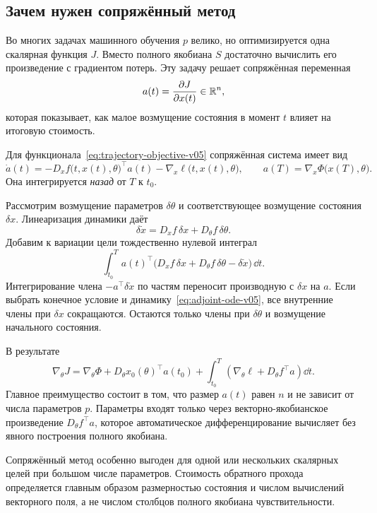 \subsection{Зачем нужен сопряжённый метод}

Во многих задачах машинного обучения $p$ велико, но оптимизируется одна скалярная функция $J$. Вместо полного якобиана $S$ достаточно вычислить его произведение с градиентом потерь. Эту задачу решает сопряжённая переменная
\[
a(t)
=
\frac{\partial J}{\partial x(t)}
\in\mathbb{R}^n,
\]
которая показывает, как малое возмущение состояния в момент $t$ влияет на итоговую стоимость.

Для функционала~\eqref{eq:trajectory-objective-v05} сопряжённая система имеет вид
\begin{equation}
\label{eq:adjoint-ode-v05}
\dot a(t)
=
- D_xf\bigl(t,x(t),\theta\bigr)^\top a(t)
-
\nabla_x\ell\bigl(t,x(t),\theta\bigr),
\qquad
 a(T)=\nabla_x\Phi\bigl(x(T),\theta\bigr).
\end{equation}
Она интегрируется \emph{назад} от $T$ к $t_0$.

\begin{derivation}
Рассмотрим возмущение параметров $\delta\theta$ и соответствующее возмущение состояния $\delta x$. Линеаризация динамики даёт
\[
\delta\dot x
=D_xf\,\delta x+D_\theta f\,\delta\theta.
\]
Добавим к вариации цели тождественно нулевой интеграл
\[
\int_{t_0}^{T}
a(t)^\top
\bigl(D_xf\,\delta x+D_\theta f\,\delta\theta-\delta\dot x\bigr)
\,\dd t.
\]
Интегрирование члена $-a^\top\delta\dot x$ по частям переносит производную с $\delta x$ на $a$. Если выбрать конечное условие и динамику~\eqref{eq:adjoint-ode-v05}, все внутренние члены при $\delta x$ сокращаются. Остаются только члены при $\delta\theta$ и возмущение начального состояния.
\end{derivation}

В результате
\begin{equation}
\label{eq:adjoint-gradient-v05}
\nabla_\theta J
=
\nabla_\theta\Phi
+
D_\theta x_0(\theta)^\top a(t_0)
+
\int_{t_0}^{T}
\left(
\nabla_\theta\ell
+D_\theta f^\top a
\right)\dd t.
\end{equation}
Главное преимущество состоит в том, что размер $a(t)$ равен $n$ и не зависит от числа параметров $p$. Параметры входят только через векторно-якобианское произведение $D_\theta f^\top a$, которое автоматическое дифференцирование вычисляет без явного построения полного якобиана.

\begin{principle}
\label{pr:when-adjoint-v05}
Сопряжённый метод особенно выгоден для одной или нескольких скалярных целей при большом числе параметров. Стоимость обратного прохода определяется главным образом размерностью состояния и числом вычислений векторного поля, а не числом столбцов полного якобиана чувствительности.
\end{principle}

